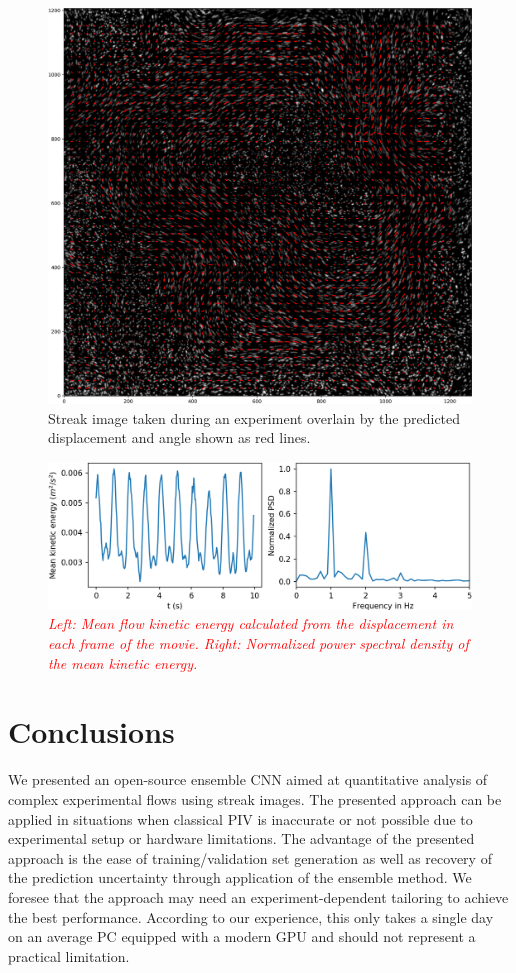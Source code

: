 \documentclass{svjour3}                     %
\newcommand{\new}[1]{\textit{\textcolor{red}{#1}}}
\begin{document}
\begin{figure}
\includegraphics[width=\textwidth]{figs/figure9.png}
\caption{Streak image taken during an experiment overlain by the predicted displacement and angle shown as red lines.}
\label{fig:fig10}
\end{figure}


\begin{figure}
	\includegraphics[width=\textwidth]{figs/figure_libration.png}
	\caption{\new{Left: Mean flow kinetic energy calculated from the displacement in each frame of the movie. Right: Normalized power spectral density of the mean kinetic energy.}}
	\label{fig:time_series}
\end{figure}


\section{Conclusions}

We presented an open-source ensemble CNN aimed at quantitative analysis of complex experimental flows using streak images. The presented approach can be applied in situations when classical PIV is inaccurate or not possible due to experimental setup or hardware limitations. The advantage of the presented approach is the ease of training/validation set generation as well as recovery of the prediction uncertainty through application of the ensemble method. We foresee that the approach may need an experiment-dependent tailoring to achieve the best performance. According to our experience, this only takes a single day on an average PC equipped with a modern GPU and should not represent a practical limitation.
\end{document}
